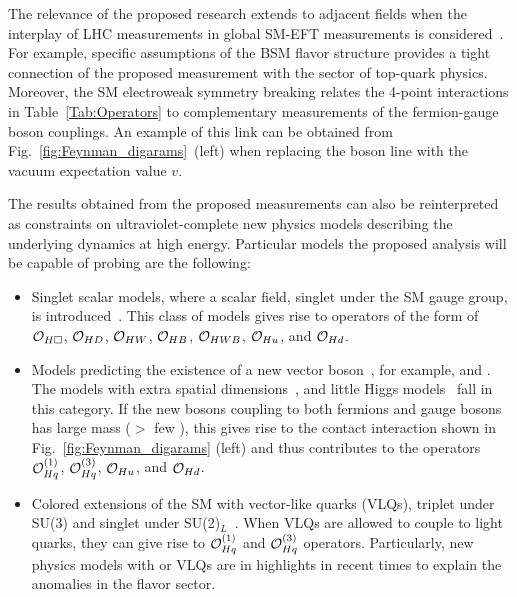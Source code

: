 \documentclass[a4paper,11pt]{article}
\begin{document}
The relevance of the proposed research extends to adjacent fields when the interplay of LHC measurements in global SM-EFT measurements is considered~\cite{Ellis:2018gqa,Ethier:2021bye}.
For example, specific assumptions of the BSM flavor structure provides a tight connection of the proposed measurement with the sector of top-quark physics. 
Moreover, the SM electroweak symmetry breaking relates the 4-point interactions in Table~\ref{Tab:Operators} to complementary measurements of the fermion-gauge boson couplings. 
An example of this link can be obtained from Fig.~\ref{fig:Feynman_digarams}~(left) when replacing the \PH boson line with the vacuum expectation value $v$.

The results obtained from the proposed measurements can also be reinterpreted as constraints on ultraviolet-complete new physics models describing the underlying dynamics at high energy.
Particular models the proposed analysis will be capable of probing are the following:
\begin{itemize}

\item Singlet scalar models, where a scalar field, singlet under the SM gauge group, is introduced~\cite{deBlas:2014mba,Profumo:2014opa}. This class of models gives rise to operators of the form of ${\cal O}_{H\square}$, ${\cal O}_{HD}$, ${\cal O}_{HW}$, ${\cal O}_{HB}$, ${\cal O}_{HWB}$, ${\cal O}_{Hu}$, and ${\cal O}_{Hd}$.

\item Models predicting the existence of a new vector boson~\cite{delAguila:2010mx}, for example, \PZprime and \PWprime. 
The models with extra spatial dimensions~\cite{Burdman:2006gy}, and little Higgs models~\cite{PhysRevD.10.275} fall in this category.
If the new bosons coupling to both fermions and gauge bosons has large mass ($>$ few \TeV), this gives rise to the contact interaction shown in Fig.~\ref{fig:Feynman_digarams} (left) and thus contributes to the operators  ${\cal O}^{(1)}_{Hq}$, ${\cal O}^{(3)}_{Hq}$, ${\cal O}_{Hu}$, and ${\cal O}_{Hd}$. 

\item Colored extensions of the SM with vector-like quarks (VLQs), triplet under SU(3) and singlet under SU(2)$_L$~\cite{delAguila:2000aa,Dawson:2012di}. 
When VLQs are allowed to couple to light quarks, they can give rise to ${\cal O}^{(1)}_{Hq}$ and ${\cal O}^{(3)}_{Hq}$ operators.
Particularly, new physics models with \PZprime or VLQs are in highlights in recent times to explain the anomalies in the flavor sector. 

\end{itemize}
\end{document}
